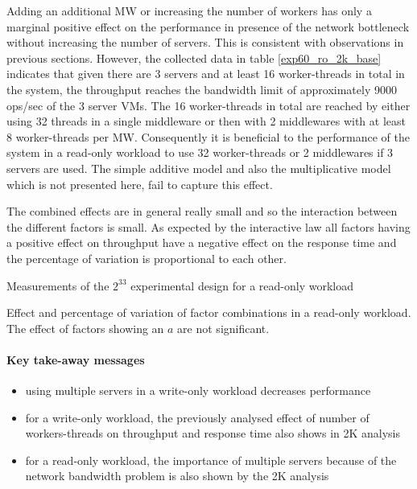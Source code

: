 \documentclass[report.tex]{subfiles}
\begin{document}
Adding an additional MW or increasing the number of workers has only a marginal positive effect on the performance in presence of the network bottleneck without increasing the number of servers. This is consistent with observations in previous sections. 
However, the collected data in table \ref{exp60_ro_2k_base} indicates that given there are 3 servers and at least 16 worker-threads in total in the system, the throughput reaches the bandwidth limit of approximately 9000 ops/sec of the 3 server VMs. The 16 worker-threads in total are reached by either using 32 threads in a single middleware or then with 2 middlewares with at least 8 worker-threads per MW.
Consequently it is beneficial to the performance of the system in a read-only workload to use 32 worker-threads or 2 middlewares if 3 servers are used.
The simple additive model and also the multiplicative model which is not presented here, fail to capture this effect.

The combined effects are in general really small and so the interaction between the different factors is small.
As expected by the interactive law all factors having a positive effect on throughput have a negative effect on the response time and the percentage of variation is proportional to each other.



\begin{table}[H]
	\centering
	\small{
		\setlength{\tabcolsep}{4.7pt}
		
		\caption{Measurements of the $2^33$ experimental design for a read-only workload}\label{exp60_ro_2k_base} 
	}
\end{table}

\begin{table}[H]
	\small{
		\centering
		\setlength{\tabcolsep}{4.5pt}
		\newcommand{\rlft}[0]{\raggedleft\arraybackslash}
		
		\caption{Effect and percentage of variation of factor combinations in a read-only workload. The effect of factors showing an $a$ are not significant.}\label{exp60_ro_2k_effect}
	}
\end{table}


\paragraph{Key take-away messages}
\begin{itemize}
	\vitemsep
	\item using multiple servers in a write-only workload decreases performance
	\item for a write-only workload, the previously analysed effect of number of workers-threads on throughput and response time also  shows in 2K analysis
	\item for a read-only workload, the importance of multiple servers because of the network bandwidth problem is also shown by the 2K analysis 
\end{itemize}
\end{document}
